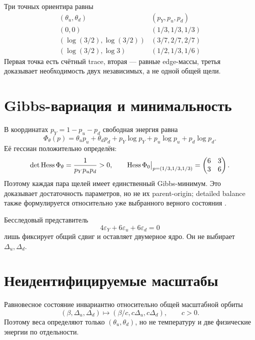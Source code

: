 Три точных ориентира равны
\begin{equation}
 \begin{array}{c|c}
 (\theta_u,\theta_d)&(p_Y,p_u,p_d)\\ \hline
 (0,0)&(1/3,1/3,1/3)\\
 (\log(3/2),\log(3/2))&(3/7,2/7,2/7)\\
 (\log(3/2),\log3)&(1/2,1/3,1/6)
 \end{array}
 \label{eq:v8-extra-mass-gap-witnesses}
\end{equation}
Первая точка есть счётный trace, вторая --- равные edge-массы, третья
доказывает необходимость двух независимых, а не одной общей щели.

\section{Gibbs-вариация и минимальность}

В координатах $p_Y=1-p_u-p_d$ свободная энергия равна
\begin{equation}
 \Phi_{\theta}(p)=\theta_up_u+\theta_dp_d
 +p_Y\log p_Y+p_u\log p_u+p_d\log p_d.
 \label{eq:v8-extra-mass-free-energy}
\end{equation}
Её гессиан положительно определён:
\begin{equation}
 \det\operatorname{Hess}\Phi_{\theta}=\frac1{p_Yp_up_d}>0,
 \qquad
 \operatorname{Hess}\Phi_0\big|_{p=(1/3,1/3,1/3)}=
 \begin{pmatrix}6&3\\3&6\end{pmatrix}.
 \label{eq:v8-extra-mass-free-energy-hessian}
\end{equation}
Поэтому каждая пара щелей имеет единственный Gibbs-минимум. Это доказывает
достаточность параметров, но не их parent-origin; detailed balance также
формулируется относительно уже выбранного верного состояния
\cite{v8-extra-mass-fagnola}.

Бесследовый представитель
\begin{equation}
 4\varepsilon_Y+6\varepsilon_u+6\varepsilon_d=0
 \label{eq:v8-extra-mass-traceless-representative}
\end{equation}
лишь фиксирует общий сдвиг и оставляет двумерное ядро. Он не выбирает
$\Delta_u,\Delta_d$.

\section{Неидентифицируемые масштабы}

Равновесное состояние инвариантно относительно общей масштабной орбиты
\begin{equation}
 (\beta,\Delta_u,\Delta_d)\longmapsto
 (\beta/c,c\Delta_u,c\Delta_d),\qquad c>0.
 \label{eq:v8-extra-mass-thermal-scale-orbit}
\end{equation}
Поэтому веса определяют только $(\theta_u,\theta_d)$, но не температуру и
две физические энергии по отдельности.

